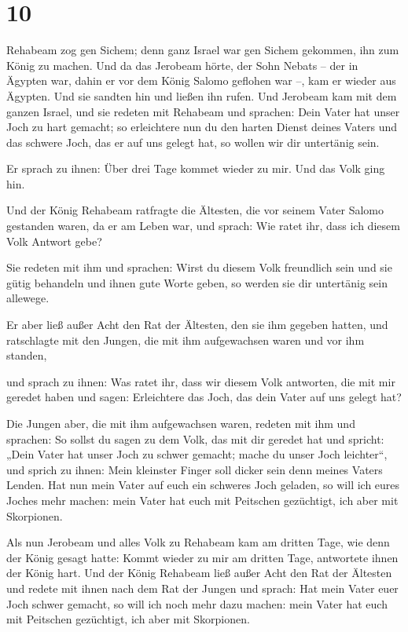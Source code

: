 \hypertarget{section-9}{%
\section{10}\label{section-9}}

 Rehabeam zog gen Sichem; denn ganz Israel war gen Sichem
gekommen, ihn zum König zu machen.  Und da das Jerobeam
hörte, der Sohn Nebats -- der in Ägypten war, dahin er vor dem König
Salomo geflohen war --, kam er wieder aus Ägypten.  Und
sie sandten hin und ließen ihn rufen. Und Jerobeam kam mit dem ganzen
Israel, und sie redeten mit Rehabeam und sprachen:  Dein
Vater hat unser Joch zu hart gemacht; so erleichtere nun du den harten
Dienst deines Vaters und das schwere Joch, das er auf uns gelegt hat, so
wollen wir dir untertänig sein.

 Er sprach zu ihnen: Über drei Tage kommet wieder zu mir.
Und das Volk ging hin.

 Und der König Rehabeam ratfragte die Ältesten, die vor
seinem Vater Salomo gestanden waren, da er am Leben war, und sprach: Wie
ratet ihr, dass ich diesem Volk Antwort gebe?

 Sie redeten mit ihm und sprachen: Wirst du diesem Volk
freundlich sein und sie gütig behandeln und ihnen gute Worte geben, so
werden sie dir untertänig sein allewege.

 Er aber ließ außer Acht den Rat der Ältesten, den sie ihm
gegeben hatten, und ratschlagte mit den Jungen, die mit ihm aufgewachsen
waren und vor ihm standen,

 und sprach zu ihnen: Was ratet ihr, dass wir diesem Volk
antworten, die mit mir geredet haben und sagen: Erleichtere das Joch,
das dein Vater auf uns gelegt hat?

 Die Jungen aber, die mit ihm aufgewachsen waren, redeten
mit ihm und sprachen: So sollst du sagen zu dem Volk, das mit dir
geredet hat und spricht: „Dein Vater hat unser Joch zu schwer gemacht;
mache du unser Joch leichter``, und sprich zu ihnen: Mein kleinster
Finger soll dicker sein denn meines Vaters Lenden.  Hat
nun mein Vater auf euch ein schweres Joch geladen, so will ich eures
Joches mehr machen: mein Vater hat euch mit Peitschen gezüchtigt, ich
aber mit Skorpionen.

 Als nun Jerobeam und alles Volk zu Rehabeam kam am
dritten Tage, wie denn der König gesagt hatte: Kommt wieder zu mir am
dritten Tage,  antwortete ihnen der König hart. Und der
König Rehabeam ließ außer Acht den Rat der Ältesten  und
redete mit ihnen nach dem Rat der Jungen und sprach: Hat mein Vater euer
Joch schwer gemacht, so will ich noch mehr dazu machen: mein Vater hat
euch mit Peitschen gezüchtigt, ich aber mit Skorpionen.

